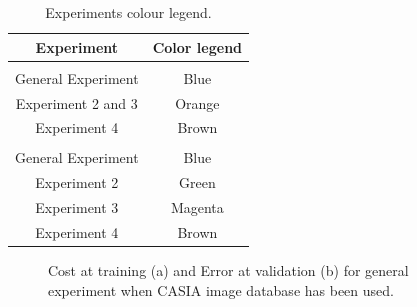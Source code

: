 \begin{table}[htb]
\centering
\begin{tabular}{|c|c|}
\hline
\rowcolor[HTML]{ECF4FF}
\textbf{Experiment}           & \textbf{Color legend}          \\ \hline
\rowcolor[HTML]{ECF4FF}
\multicolumn{2}{|c|}{\cellcolor[HTML]{ECF4FF}Training cost}    \\ \hline
General Experiment            & Blue                           \\ \hline
Experiment 2 and 3            & Orange                         \\ \hline
Experiment 4                  & Brown                          \\ \hline
\rowcolor[HTML]{ECF4FF}
\multicolumn{2}{|c|}{\cellcolor[HTML]{ECF4FF}Validation Error} \\ \hline
General Experiment            & Blue                           \\ \hline
Experiment 2                  & Green                          \\ \hline
Experiment 3                  & Magenta                        \\ \hline
Experiment 4                  & Brown                          \\ \hline
\end{tabular}
\caption{Experiments colour legend.}
\label{table:color_legend}
\end{table}

\begin{figure}[htb]
\centering
{}
\caption{Cost at training (a) and Error at validation (b) for general experiment when CASIA image database has been used.}
\label{fig:casia-ejec1}
\end{figure}

